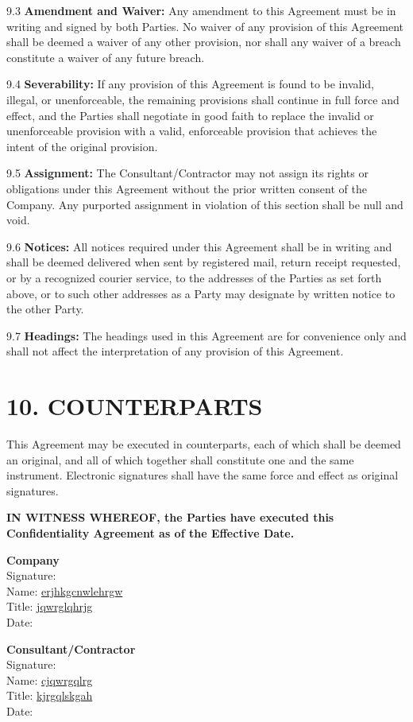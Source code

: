 \documentclass[12pt]{article}
\begin{document}
9.3 \textbf{Amendment and Waiver:} Any amendment to this Agreement must be in writing and signed by both Parties. No waiver of any provision of this Agreement shall be deemed a waiver of any other provision, nor shall any waiver of a breach constitute a waiver of any future breach.

9.4 \textbf{Severability:} If any provision of this Agreement is found to be invalid, illegal, or unenforceable, the remaining provisions shall continue in full force and effect, and the Parties shall negotiate in good faith to replace the invalid or unenforceable provision with a valid, enforceable provision that achieves the intent of the original provision.

9.5 \textbf{Assignment:} The Consultant/Contractor may not assign its rights or obligations under this Agreement without the prior written consent of the Company. Any purported assignment in violation of this section shall be null and void.

9.6 \textbf{Notices:} All notices required under this Agreement shall be in writing and shall be deemed delivered when sent by registered mail, return receipt requested, or by a recognized courier service, to the addresses of the Parties as set forth above, or to such other addresses as a Party may designate by written notice to the other Party.

9.7 \textbf{Headings:} The headings used in this Agreement are for convenience only and shall not affect the interpretation of any provision of this Agreement.

\section*{10. COUNTERPARTS}

This Agreement may be executed in counterparts, each of which shall be deemed an original, and all of which together shall constitute one and the same instrument. Electronic signatures shall have the same force and effect as original signatures.

\vspace{1cm}

\textbf{IN WITNESS WHEREOF, the Parties have executed this Confidentiality Agreement as of the Effective Date.}

\vspace{1cm}

\textbf{Company} \\
Signature: \underline{\hspace{6cm}} \\
Name: \underline{erjhkgcnwlehrgw} \\
Title: \underline{jqwrglqhrjg} \\
Date: \underline{\hspace{5cm}}

\vspace{1cm}

\textbf{Consultant/Contractor} \\
Signature: \underline{\hspace{6cm}} \\
Name: \underline{cjqwrgqlrg} \\
Title: \underline{kjrgqlskgah} \\
Date: \underline{\hspace{5cm}}
\end{document}
